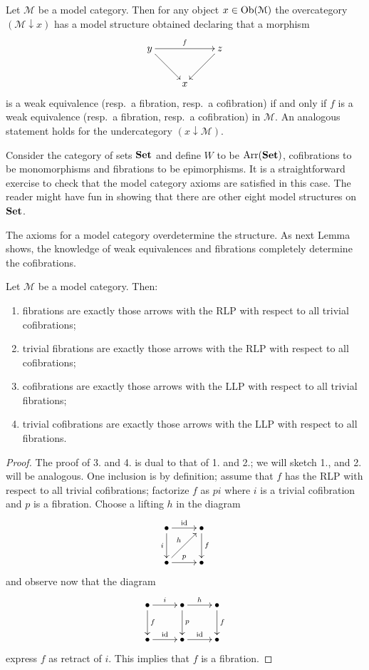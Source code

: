 \begin{refsection}
\begin{eg} \label{eg model structure overcategories}
Let $\mathcal M$ be a model category. Then for any object $x \in \operatorname{Ob}(\mathcal M)$ the overcategory $(\mathcal M \downarrow x)$ has a model structure obtained declaring that a morphism
\[
\xymatrix{
y \ar[rr]^f \ar[dr] & & z \ar[dl] \\ & x
}
\]
is a weak equivalence (resp.\ a fibration, resp.\ a cofibration) if and only if $f$ is a weak equivalence (resp.\ a fibration, resp.\ a cofibration) in $\mathcal M$. An analogous statement holds for the undercategory $(x \downarrow \mathcal M)$.
\end{eg}

\begin{eg} \label{eg model structure set}
Consider the category of sets $\mathbf{Set}$ and define $W$ to be $\mathrm{Arr}(\mathbf{Set})$, cofibrations to be monomorphisms and fibrations to be epimorphisms. It is a straightforward exercise to check that the model category axioms are satisfied in this case. The reader might have fun in showing that there are other eight model structures on $\mathbf{Set}$.
\end{eg}

The axioms for a model category overdetermine the structure. As next Lemma shows, the knowledge of weak equivalences and fibrations completely determine the cofibrations.

\begin{lemma}
Let $\mathcal M$ be a model category. Then:
\begin{enumerate}
\item fibrations are exactly those arrows with the RLP with respect to all trivial cofibrations;
\item trivial fibrations are exactly those arrows with the RLP with respect to all cofibrations;
\item cofibrations are exactly those arrows with the LLP with respect to all trivial fibrations;
\item trivial cofibrations are exactly those arrows with the LLP with respect to all fibrations.
\end{enumerate}
\end{lemma}

\begin{proof}
The proof of 3. and 4. is dual to that of 1. and 2.; we will sketch 1., and 2. will be analogous. One inclusion is by definition; assume that $f$ has the RLP with respect to all trivial cofibrations; factorize $f$ as $pi$ where $i$ is a trivial cofibration and $p$ is a fibration. Choose a lifting $h$ in the diagram
\[
\xymatrix{
\bullet \ar[r]^{\mathrm{id}} \ar[d]_i & \bullet \ar[d]^f \\ \bullet \ar[r]^p \ar[ur]^h & \bullet
}
\]
and observe now that the diagram
\[
\xymatrix{
\bullet \ar[r]^i \ar[d]^f & \bullet \ar[d]^p \ar[r]^h & \bullet \ar[d]^f \\ \bullet \ar[r]^{\mathrm{id}} & \bullet \ar[r]^{\mathrm{id}} & \bullet
}
\]
express $f$ as retract of $i$. This implies that $f$ is a fibration.
\end{proof}


\end{refsection}
